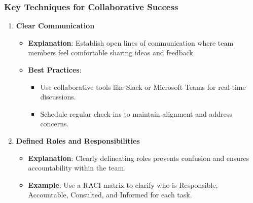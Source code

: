 \documentclass{beamer}
\begin{document}
\begin{frame}[fragile]
    \frametitle{Key Techniques for Collaborative Success}
    \begin{enumerate}
        \item \textbf{Clear Communication}
            \begin{itemize}
                \item \textbf{Explanation}: Establish open lines of communication where team members feel comfortable sharing ideas and feedback.
                \item \textbf{Best Practices}:
                    \begin{itemize}
                        \item Use collaborative tools like Slack or Microsoft Teams for real-time discussions.
                        \item Schedule regular check-ins to maintain alignment and address concerns.
                    \end{itemize}
            \end{itemize}
        
        \item \textbf{Defined Roles and Responsibilities}
            \begin{itemize}
                \item \textbf{Explanation}: Clearly delineating roles prevents confusion and ensures accountability within the team.
                \item \textbf{Example}: Use a RACI matrix to clarify who is Responsible, Accountable, Consulted, and Informed for each task.
            \end{itemize}
    \end{enumerate}
\end{frame}
\end{document}
